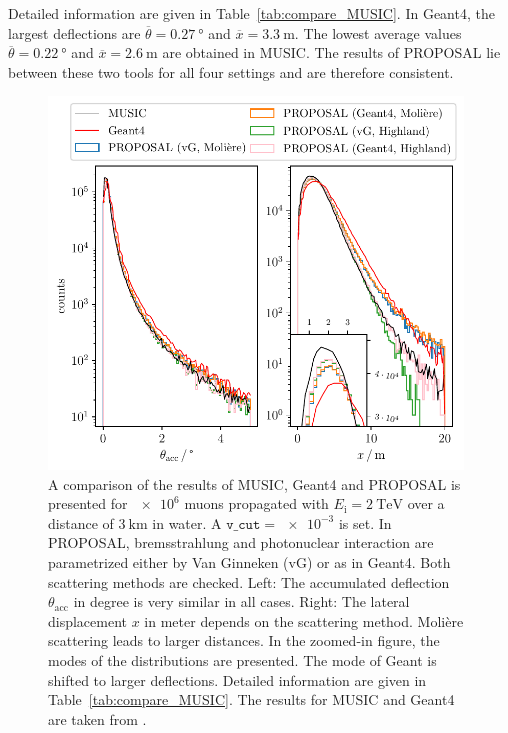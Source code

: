 \documentclass[pdflatex, sn-mathphys]{sn-jnl}%
\theoremstyle{thmstyleone}%
\theoremstyle{thmstyletwo}%
\theoremstyle{thmstylethree}%
\begin{document}
Detailed information are given in Table~\ref{tab:compare_MUSIC}. In Geant4, the 
largest deflections are $\overline{\theta} = \SI{0.27}{\degree}$ 
and $\overline{x} = \SI{3.3}{\meter}$. The lowest average values $\overline{\theta} = \SI{0.22}{\degree}$ and 
$\overline{x} = \SI{2.6}{\meter}$ are obtained in MUSIC. The results of PROPOSAL lie between 
these two tools for all four settings and are therefore consistent. 

\begin{figure}
    \centering 
    \includegraphics[width=0.98\textwidth]{../../deflection/plots/FINAL/2TeV_1e6events_accumulated_defl_paper_combined_zoom.pdf}
    \caption{A comparison of the results of MUSIC, Geant4 and PROPOSAL is presented for $\num{e6}$ muons propagated with 
    $E_{\text{i}} = \SI{2}{\tera\electronvolt}$ over a distance of 
    $\SI{3}{\kilo\meter}$ in water. A $\texttt{v\_cut} = \num{e-3}$ is set. In PROPOSAL, 
    bremsstrahlung and photonuclear interaction are parametrized either by 
    Van Ginneken (vG) or as in Geant4. Both scattering methods are checked. 
    Left: The accumulated deflection $\theta_{\mathrm{acc}}$ in degree is very similar in all cases.
    Right: The lateral displacement $x$ in meter depends 
    on the scattering method. Molière scattering leads to larger distances.
    In the zoomed-in figure, the modes of the distributions are presented. 
    The mode of Geant is shifted to larger deflections.
    Detailed information are given in 
    Table~\ref{tab:compare_MUSIC}. The results for MUSIC and Geant4 are taken from 
    \cite{comparison_MUSIC_GEANT4_2009}.}
    \label{fig:compare_MUSIC}
\end{figure}
\end{document}
